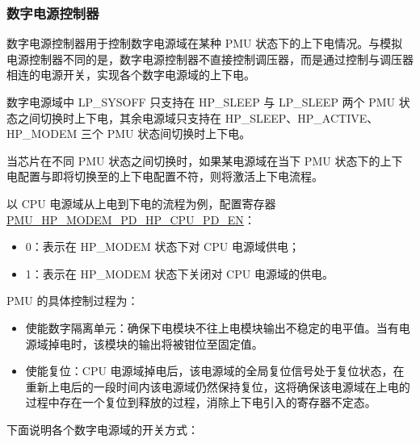 \documentclass[main\_\_CN.tex]{subfiles}
\begin{document}
\subsubsection{数字电源控制器}

数字电源控制器用于控制数字电源域在某种 PMU 状态下的上下电情况。与模拟电源控制器不同的是，数字电源控制器不直接控制调压器，而是通过控制与调压器相连的电源开关，实现各个数字电源域的上下电。

数字电源域中 LP\_SYSOFF 只支持在 HP\_SLEEP 与 LP\_SLEEP 两个 PMU 状态之间切换时上下电，其余电源域只支持在 HP\_SLEEP、HP\_ACTIVE、HP\_MODEM 三个 PMU 状态间切换时上下电。

当芯片在不同 PMU 状态之间切换时，如果某电源域在当下 PMU 状态下的上下电配置与即将切换至的上下电配置不符，则将激活上下电流程。

以 CPU 电源域从上电到下电的流程为例，配置寄存器 \hyperref[fielddesc:PMUHPMODEMPDHPCPUPDEN]{PMU\_HP\_MODEM\_PD\_HP\_CPU\_PD\_EN}：
\begin{itemize}
    \item 0：表示在 HP\_MODEM 状态下对 CPU 电源域供电；
    \item 1：表示在 HP\_MODEM 状态下关闭对 CPU 电源域的供电。
\end{itemize}

PMU 的具体控制过程为：

\begin{itemize}
\item 使能数字隔离单元：确保下电模块不往上电模块输出不稳定的电平值。当有电源域掉电时，该模块的输出将被钳位至固定值。

\item 使能复位：CPU 电源域掉电后，该电源域的全局复位信号处于复位状态，在重新上电后的一段时间内该电源域仍然保持复位，这将确保该电源域在上电的过程中存在一个复位到释放的过程，消除上下电引入的寄存器不定态。

\end{itemize}

下面说明各个数字电源域的开关方式：
\end{document}
